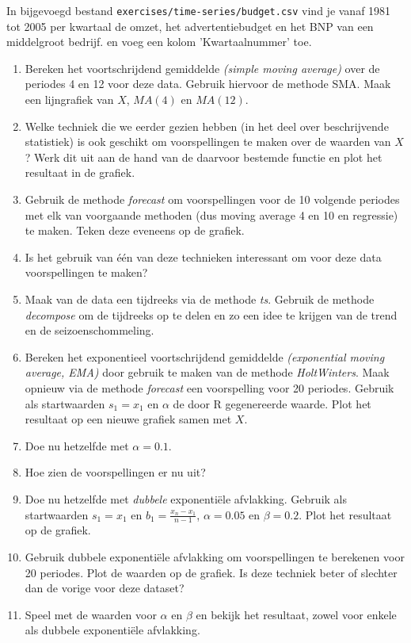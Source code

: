 \begin{exercise}
  In bijgevoegd bestand \texttt{exercises/time-series/budget.csv} vind je vanaf 1981 tot 2005 per kwartaal de omzet, het advertentiebudget en het BNP van een middelgroot bedrijf.  en voeg een kolom 'Kwartaalnummer' toe.
  \begin{enumerate}
    \item Bereken het voortschrijdend gemiddelde \emph{(simple moving average)} over de periodes 4 en 12 voor deze data. Gebruik hiervoor de methode SMA. Maak een lijngrafiek van $X$, $MA(4)$ en $MA(12)$.
    \item Welke techniek die we eerder gezien hebben (in het deel over beschrijvende statistiek) is ook geschikt om voorspellingen te maken over de waarden van $X$? Werk dit uit aan de hand van de daarvoor bestemde functie en plot het resultaat in de grafiek.
    \item Gebruik de methode \emph{forecast} om voorspellingen voor de 10 volgende periodes met elk van voorgaande methoden (dus moving average 4 en 10 en regressie) te maken. Teken deze eveneens op de grafiek.
    \item Is het gebruik van één van deze technieken interessant om voor deze data voorspellingen te maken? 
    \item Maak van de data een tijdreeks via de methode \emph{ts}. Gebruik de methode \emph{decompose} om de tijdreeks op te delen en zo een idee te krijgen van de trend en de seizoenschommeling.
    \item Bereken het exponentieel voortschrijdend gemiddelde \emph{(exponential moving average, EMA)} door gebruik te maken van de methode \emph{HoltWinters}. Maak opnieuw via de methode \emph{forecast} een voorspelling voor 20 periodes. Gebruik als startwaarden $s_1 = x_1$ en $\alpha $ de door R gegenereerde waarde. Plot het resultaat op een nieuwe grafiek samen met $X$.
    \item Doe nu hetzelfde met $\alpha=0.1$. 
    \item Hoe zien de voorspellingen er nu uit?
    \item Doe nu hetzelfde met \emph{dubbele} exponentiële afvlakking. Gebruik als startwaarden $s_1 = x_1$ en $b_1 = \frac{x_n - x_1}{n - 1}$, $\alpha =  0.05$ en $\beta = 0.2$. Plot het resultaat op de grafiek.
    \item Gebruik dubbele exponentiële afvlakking om voorspellingen te berekenen voor 20 periodes. Plot de waarden op de grafiek. Is deze techniek beter of slechter dan de vorige voor deze dataset?
    \item Speel met de waarden voor $\alpha$ en $\beta$ en bekijk het resultaat, zowel voor enkele als dubbele exponentiële afvlakking.

\end{enumerate}
\end{exercise}
